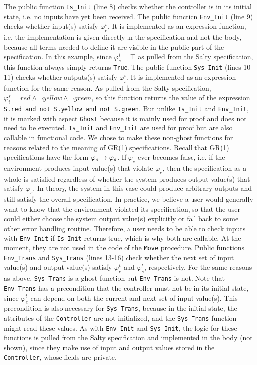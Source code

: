 \documentclass[runningheads]{llncs}
\begin{document}
The public function \lstinline{Is_Init} (line 8) checks whether the controller is in its initial state, i.e. no inputs have yet been received. 
The public function \lstinline{Env_Init} (line 9) checks whether input(s) satisfy $\varphi_e^i$. 
It is implemented as an expression function, i.e. the implementation is given directly in the specification and not the body, 
because all terms needed to define it are visible in the public part of the specification. 
In this example, since $\varphi_e^i = \top$ as pulled from the Salty specification, this function always simply returns \lstinline{True}. 
The public function \lstinline{Sys_Init} (lines 10-11) checks whether outputs(s) satisfy $\varphi_s^i$. 
It is implemented as an expression function for the same reason.  
As pulled from the Salty specification, $\varphi^s_i = red \land \lnot yellow \land \lnot green$, so this function returns the value of
the expression \lstinline{S.red and not S.yellow and not S.green}.
But unlike \lstinline{Is_Init} and \lstinline{Env_Init}, it is marked with aspect \lstinline{Ghost} because it is mainly used for proof and does not need to be executed. 
\lstinline{Is_Init} and \lstinline{Env_Init} are used for proof but are also callable in functional code. 
We chose to make these non-ghost functions for reasons related to the meaning of GR(1) specifications. 
Recall that GR(1) specifications have the form $\varphi_e \rightarrow \varphi_s$. 
If $\varphi_e$ ever becomes false, i.e. if the environment produces input value(s) that violate $\varphi_e$, then the specification as a whole 
is satisfied regardless of whether the system produces output value(s) that satisfy $\varphi_s$. 
In theory, the system in this case could produce arbitrary outputs and still satisfy the overall specification. 
In practice, we believe a user would generally want to know that the environment violated its specification, 
so that the user could either choose the system output value(s) explicitly or fall back to some other error handling routine. 
Therefore, a user needs to be able to check inputs with \lstinline{Env_Init} if \lstinline{Is_Init} returns true, 
which is why both are callable. At the moment, they are not used in the code of the \lstinline{Move} procedure.
Public functions \lstinline{Env_Trans} and \lstinline{Sys_Trans} (lines 13-16) check whether the next set of input value(s) and output value(s) 
satisfy $\varphi_e^t$ and $\varphi_s^t$, respectively. 
For the same reasons as above, \lstinline{Sys_Trans} is a ghost function but \lstinline{Env_Trans} is not.
Note that \lstinline{Env_Trans} has a precondition that the controller must not be in its initial state, 
since $\varphi_e^t$ can depend on both the current and next set of input value(s). 
This precondition is also necessary for \lstinline{Sys_Trans}, because in the initial state, the attributes of the \lstinline{Controller} are not initialized, and the \lstinline{Sys_Trans} function might read these values. 
As with \lstinline{Env_Init} and \lstinline{Sys_Init}, the logic for these functions is pulled from the Salty specification and 
implemented in the body (not shown), since they make use of input and output values stored in the \lstinline{Controller}, whose fields are private.
\end{document}
